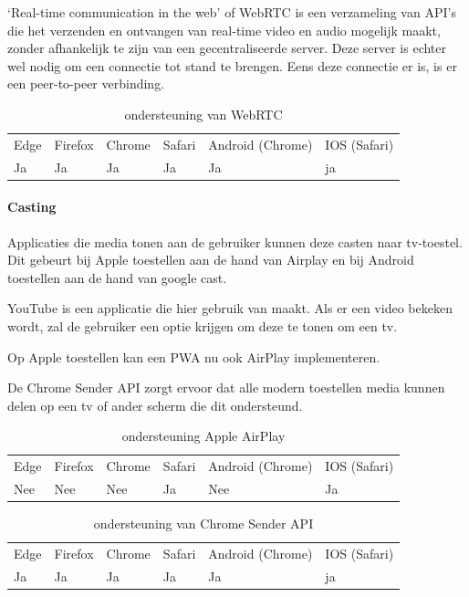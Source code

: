 ‘Real-time communication in the web’ of WebRTC \autocite{Jennings2020} is een verzameling van API’s die het verzenden en ontvangen van real-time video en audio mogelijk maakt, zonder afhankelijk te zijn van een gecentraliseerde server. Deze server is echter wel nodig om een connectie tot stand te brengen. Eens deze connectie er is, is er een peer-to-peer verbinding.

\begin{table}[H]
	\centering
	\begin{tabular}{llllll}
		Edge & Firefox & Chrome & Safari & Android (Chrome) & IOS (Safari) \\
		Ja   & Ja      & Ja     & Ja     & Ja               & ja          
	\end{tabular}	
	\caption{ondersteuning van WebRTC}
	\label{ondersteuning van WebRTC}
\end{table}




\paragraph{Casting}


Applicaties die media tonen aan de gebruiker kunnen deze casten naar tv-toestel. Dit gebeurt bij Apple toestellen aan de hand van Airplay en bij Android toestellen aan de hand van google cast.


YouTube is een applicatie die hier gebruik van maakt. Als er een video bekeken wordt, zal de gebruiker een optie krijgen om deze te tonen om een tv.


Op Apple toestellen kan een PWA nu ook AirPlay implementeren. 

\autocite{Apple2020a}


De Chrome Sender API \autocite{Developers2020b} zorgt ervoor dat alle modern toestellen media kunnen delen op een tv of ander scherm die dit ondersteund.

\begin{table}[H]
	\centering
	\begin{tabular}{llllll}
		Edge & Firefox & Chrome & Safari & Android (Chrome) & IOS (Safari) \\
		Nee   & Nee      & Nee     & Ja     & Nee               & Ja          
	\end{tabular}	
	\caption{ondersteuning Apple AirPlay}
	\label{ondersteuning Apple AirPlay}
\end{table}
\begin{table}[H]
	\centering
	\begin{tabular}{llllll}
		Edge & Firefox & Chrome & Safari & Android (Chrome) & IOS (Safari) \\
		Ja   & Ja      & Ja     & Ja     & Ja               & ja          
	\end{tabular}	
	\caption{ondersteuning van Chrome Sender API}
	\label{ndersteuning van Chrome Sender API}
\end{table}




